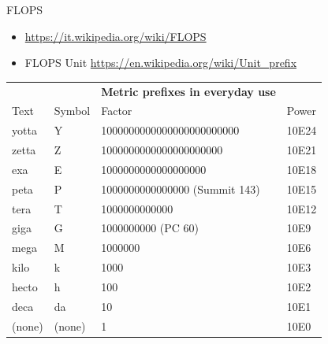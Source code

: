 \documentclass[ignorenonframetext,]{beamer}
\providecommand{\tightlist}{%
  \setlength{\itemsep}{0pt}\setlength{\parskip}{0pt}}
\begin{document}
\begin{frame}{FLOPS}

\begin{itemize}
\tightlist
\item
  \url{https://it.wikipedia.org/wiki/FLOPS}
\item
  FLOPS Unit \url{https://en.wikipedia.org/wiki/Unit_prefix}
\end{itemize}


\begin{longtable}[]{@{}llll@{}}
\toprule
\endhead
& & \textbf{Metric prefixes in everyday use} &\tabularnewline
Text & Symbol & Factor & Power\tabularnewline
yotta & Y & 1000000000000000000000000 & 10E24\tabularnewline
zetta & Z & 1000000000000000000000 & 10E21\tabularnewline
exa & E & 1000000000000000000 & 10E18\tabularnewline
peta & P & 1000000000000000 (Summit 143) & 10E15\tabularnewline
tera & T & 1000000000000 & 10E12\tabularnewline
giga & G & 1000000000 (PC 60) & 10E9\tabularnewline
mega & M & 1000000 & 10E6\tabularnewline
kilo & k & 1000 & 10E3\tabularnewline
hecto & h & 100 & 10E2\tabularnewline
deca & da & 10 & 10E1\tabularnewline
(none) & (none) & 1 & 10E0\tabularnewline
\bottomrule
\end{longtable}

\end{frame}
\end{document}
